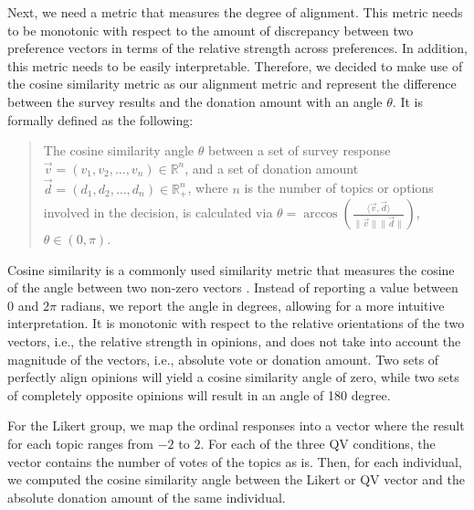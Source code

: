 Next, we need a metric that measures the degree of alignment. This metric needs to be monotonic with respect to the amount of discrepancy between two preference vectors in terms of the relative strength across preferences. In addition, this metric needs to be easily interpretable. Therefore, we decided to make use of the cosine similarity metric as our alignment metric and represent the difference between the survey results and the donation amount with an angle $\theta$. It is formally defined as the following:

\begin{quote}
    The cosine similarity angle $\theta$ between a set of survey response $\vec{v} = (v_1, v_2,\dots, v_n) \in \mathbb{R}^n$, and a set of donation amount $\vec{d} = (d_1, d_2,\dots, d_n) \in \mathbb{R}_{+}^n$, where $n$ is the number of topics or options involved in the decision, is calculated via $\theta = \arccos \left ( {\frac{\langle \vec{v},  \vec{d} \rangle}{\|\vec{v}\| \|\vec{d}\|}} \right )$, $\theta \in (0, \pi)$.
\end{quote}

Cosine similarity is a commonly used similarity metric 
that measures the cosine of the angle between two non-zero vectors \cite{singhal2001modern}. Instead of reporting a value between $0$ and $2 \pi$ radians, we report the angle in degrees, allowing for a more intuitive interpretation.
It is monotonic with respect to the relative orientations of the two vectors, i.e., the relative strength in opinions, and does not take into account the magnitude of the vectors, i.e., absolute vote or donation amount. Two sets of perfectly align opinions will yield a cosine similarity angle of zero, while two sets of completely opposite opinions will result in an angle of 180 degree.

For the Likert group, we map the ordinal responses into a vector where the result for each topic ranges from $-2$ to $2$. For each of the three QV conditions, the vector contains the number of votes of the topics as is. Then, for each individual, we computed the cosine similarity angle between the Likert or QV vector and the absolute donation amount of the same individual. 

